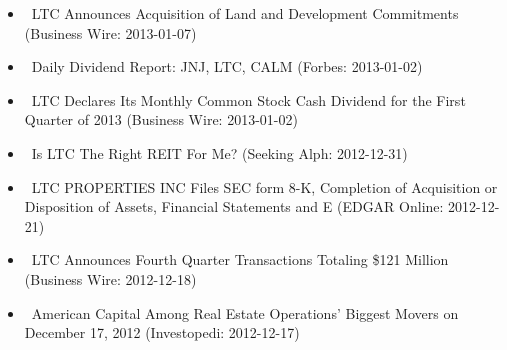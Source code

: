\documentclass[11pt,asymmetric]{article}
\begin{document}
\begin{itemize}
\item\ LTC Announces Acquisition of Land and Development Commitments (Business Wire: 2013-01-07)
\item\ Daily Dividend Report: JNJ, LTC, CALM (Forbes: 2013-01-02)
\item\ LTC Declares Its Monthly Common Stock Cash Dividend for the First Quarter of 2013 (Business Wire: 2013-01-02)
\item\ Is LTC The Right REIT For Me? (Seeking Alph: 2012-12-31)
\item\ LTC PROPERTIES INC Files SEC form 8-K, Completion of Acquisition or Disposition of Assets, Financial Statements and E (EDGAR Online: 2012-12-21)
\item\ LTC Announces Fourth Quarter Transactions Totaling \$121 Million (Business Wire: 2012-12-18)
\item\ American Capital Among Real Estate Operations' Biggest Movers on December 17, 2012 (Investopedi: 2012-12-17)
\end{itemize}
\end{document}
